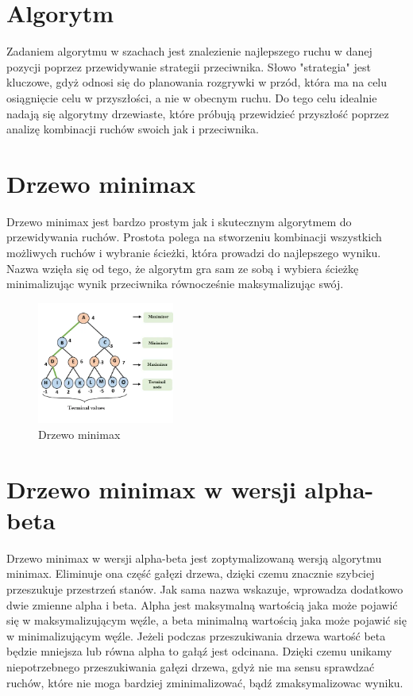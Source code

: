 \section*{Algorytm}
Zadaniem algorytmu w szachach jest znalezienie najlepszego ruchu w danej pozycji poprzez przewidywanie strategii przeciwnika. Słowo "strategia" jest kluczowe, gdyż odnosi się do planowania rozgrywki w przód, która ma na celu osiągnięcie celu w przyszłości, a nie w obecnym ruchu. Do tego celu idealnie nadają się algorytmy drzewiaste, które próbują przewidzieć przyszłość poprzez analizę kombinacji ruchów swoich jak i przeciwnika.

\section*{Drzewo minimax}
Drzewo minimax jest bardzo prostym jak i skutecznym algorytmem do przewidywania ruchów. Prostota polega na stworzeniu kombinacji wszystkich możliwych ruchów i wybranie ścieżki, która prowadzi do najlepszego wyniku. Nazwa wzięła się od tego, że algorytm gra sam ze sobą i wybiera ścieżkę minimalizując wynik przeciwnika równocześnie maksymalizując swój. 



\begin{figure}[!ht]
\centering
\includegraphics[width=0.4\textwidth]{images/minimax.jpg}
\caption{Drzewo minimax}
\end{figure}

\section*{Drzewo minimax w wersji alpha-beta}
Drzewo minimax w wersji alpha-beta jest zoptymalizowaną wersją algorytmu minimax. Eliminuje ona część gałęzi drzewa, dzięki czemu znacznie szybciej przeszukuje przestrzeń stanów. Jak sama nazwa wskazuje, wprowadza dodatkowo dwie zmienne alpha i beta. Alpha jest maksymalną wartością jaka może pojawić się w maksymalizującym węźle, a beta minimalną wartością jaka może pojawić się w minimalizującym węźle. Jeżeli podczas przeszukiwania drzewa wartość beta będzie mniejsza lub równa alpha to gałąź jest odcinana. Dzięki czemu unikamy niepotrzebnego przeszukiwania gałęzi drzewa, gdyż nie ma sensu sprawdzać ruchów, które nie moga bardziej zminimalizować, bądź zmaksymalizowac wyniku.

